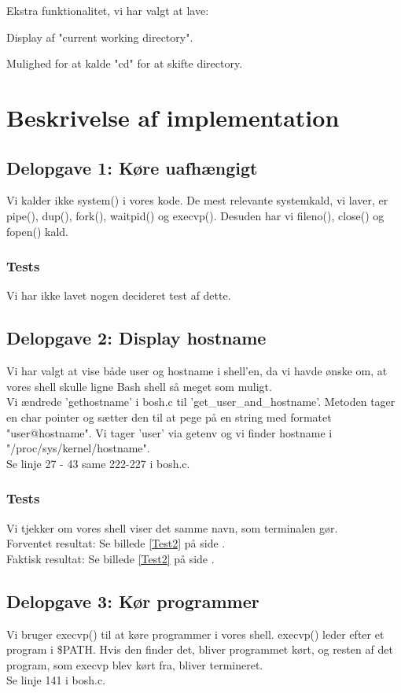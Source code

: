 Ekstra funktionalitet, vi har valgt at lave:
\begin{my_enumerate}
\item Display af "current working directory".
\item Mulighed for at kalde "cd" for at skifte directory.
\end{my_enumerate}

\section{Beskrivelse af implementation}
\subsection{Delopgave 1: Køre uafhængigt}
\label{D1}
Vi kalder ikke system() i vores kode. De mest relevante systemkald, vi laver, er pipe(), dup(), fork(), waitpid() og execvp(). Desuden har vi fileno(), close() og fopen() kald.
\subsubsection{Tests}
Vi har ikke lavet nogen decideret test af dette.

\subsection{Delopgave 2: Display hostname}
\label{D2}
Vi har valgt at vise både user og hostname i shell'en, da vi havde ønske om, at vores shell skulle ligne Bash shell så meget som muligt.
\\Vi ændrede 'gethostname' i bosh.c til 'get\_user\_and\_hostname'. Metoden tager en char pointer og sætter den til at pege på en string med formatet "user@hostname". Vi tager 'user' via getenv og vi finder hostname i "/proc/sys/kernel/hostname".
\\Se linje 27 - 43 same 222-227 i bosh.c.
\subsubsection{Tests}
Vi tjekker om vores shell viser det samme navn, som terminalen gør.
\\Forventet resultat: Se billede \ref{Test2} på side \pageref{Test2}.
\\Faktisk resultat: Se billede \ref{Test2} på side \pageref{Test2}.

\subsection{Delopgave 3: Kør programmer}
\label{D3}
Vi bruger execvp() til at køre programmer i vores shell. execvp() leder efter et program i \$PATH. Hvis den finder det, bliver programmet kørt, og resten af det program, som execvp blev kørt fra, bliver termineret. 
\\Se linje 141 i bosh.c.
